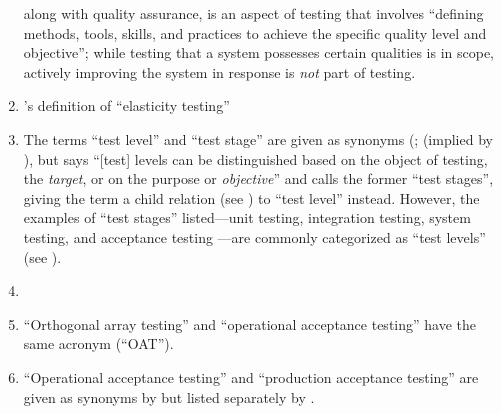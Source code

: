 \begin{enumerate}
          along with quality assurance, is an aspect of testing that involves
          ``defining methods, tools, skills, and practices to achieve the
          specific quality level and objective''; while testing that a system
          possesses certain qualities is in scope, actively improving the
          system in response is \emph{not} part of testing.
    \item %
           \citet[p.~5\=/9]{SWEBOK2024}'s definition of
          ``elasticity testing'' \swebokElasRef{}
    \item %
          The terms ``test level'' and ``test stage'' are given as synonyms
          \ifnotpaper (\citealpISTQB{}; \else \cite{ISTQB} (\fi implied
          by \citealp[p.~9]{Gerrard2000a}), but
          \citet[p.~5\=/6]{SWEBOK2024} says ``[test] levels can be distinguished
          based on the object of testing, the \emph{target}, or on the purpose
          or \emph{objective}'' and calls the former ``test stages'', giving
          the term a child relation (see ) to ``test level''
          instead. However, the examples of ``test stages'' listed---unit
          testing, integration testing, system testing, and acceptance testing
          \citep[pp.~5\=/6 to 5\=/7]{SWEBOK2024}---are commonly categorized as
          ``test levels'' (see ).
    \item %
          \tolTestFlaw{}
    \item %
          ``Orthogonal array testing'' \ifnotpaper \citetext{%
                  \citealp[pp.~5\=/1, 5\=/11]{SWEBOK2024};
                  implied by \citealp[pp.~467, 473]{Valcheva2013};
                  \citealp[pp.~1573\==1577, 1580]{YuEtAl2011}} \else
              \cite[pp.~5\=/1, 5\=/11]{SWEBOK2024} \fi and ``operational
          acceptance testing'' \citep[p.~30]{Firesmith2015} have the same
          acronym (``OAT'').
    \item %
          ``Operational acceptance testing'' and ``production acceptance
          testing'' are given as synonyms by \citetISTQB{} but listed
          separately by \citet[p.~30]{Firesmith2015}.


\end{enumerate}
